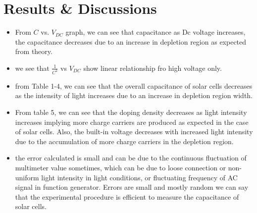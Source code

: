 \section{Results \& Discussions}
\begin{itemize}
    \item From $C$ vs. $V_{DC}$ graph, we can see that capacitance as Dc voltage increases, the capacitance decreases due to an increase in depletion region as expected from theory.
    \item we see that $\frac{1}{C^2}$ vs $V_{DC}$ show linear relationship fro high voltage only.
    \item from Table 1-4, we can see that the overall capacitance  of solar cells decreases as the intensity of light increases due to an increase in depletion region width.
    \item From table 5, we can see that the doping density decreases as light intensity increases implying more charge carriers are produced as expected in the case of solar cells. Also, the built-in voltage decreases with increased light intensity due to the accumulation of more charge carriers in the depletion region.
    \item the error calculated is small and can be due to the continuous fluctuation of multimeter value sometimes, which can be due to loose connection or non-uniform light intensity in light conditions, or fluctuating frequency of AC signal in function generator. Errors are small and mostly random we can say that the experimental procedure is efficient to measure the capacitance of solar cells.
    
    
\end{itemize}
		
	